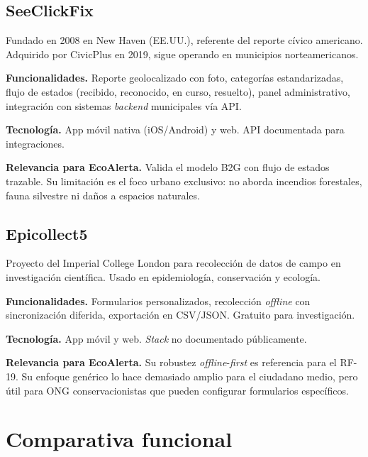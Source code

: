 \subsection{SeeClickFix}
\label{subsec:seeclickfix}

Fundado en 2008 en New Haven (EE.UU.), referente del reporte cívico americano. Adquirido por CivicPlus en 2019, sigue operando en municipios norteamericanos.

\textbf{Funcionalidades.}  Reporte geolocalizado con foto, categorías estandarizadas, flujo de estados (recibido, reconocido, en curso, resuelto), panel administrativo, integración con sistemas \textit{backend} municipales vía API.

\textbf{Tecnología.}  App móvil nativa (iOS/Android) y web. API documentada para integraciones.

\textbf{Relevancia para EcoAlerta.}  Valida el modelo B2G con flujo de estados trazable. Su limitación es el foco urbano exclusivo: no aborda incendios forestales, fauna silvestre ni daños a espacios naturales.


\subsection{Epicollect5}
\label{subsec:epicollect}

Proyecto del Imperial College London para recolección de datos de campo en investigación científica. Usado en epidemiología, conservación y ecología.

\textbf{Funcionalidades.}  Formularios personalizados, recolección \textit{offline} con sincronización diferida, exportación en CSV/JSON. Gratuito para investigación.

\textbf{Tecnología.}  App móvil y web. \textit{Stack} no documentado públicamente.

\textbf{Relevancia para EcoAlerta.}  Su robustez \textit{offline}-\textit{first} es referencia para el RF-19. Su enfoque genérico lo hace demasiado amplio para el ciudadano medio, pero útil para ONG conservacionistas que pueden configurar formularios específicos.


\section{Comparativa funcional}
\label{sec:comparativa-funcional}

\providecommand{\cmark}{\ensuremath{\checkmark}}
\providecommand{\pmark}{$\sim$}
\providecommand{\xmark}{$\times$}

